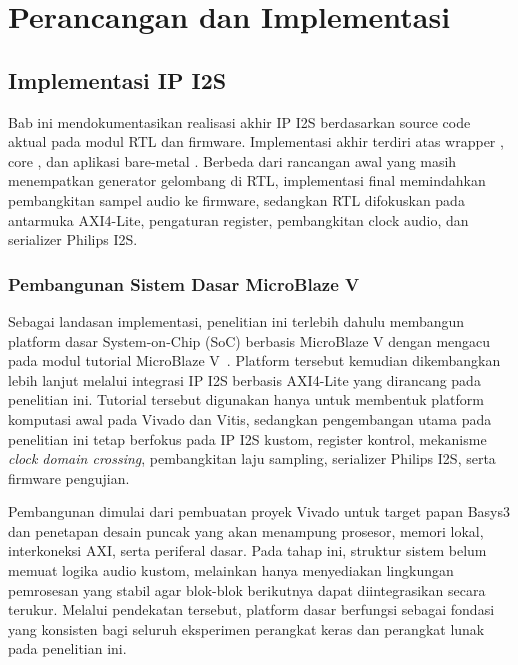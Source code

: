 \chapter{Perancangan dan Implementasi}

\section{Implementasi IP I2S}

Bab ini mendokumentasikan realisasi akhir IP I2S berdasarkan source code aktual pada modul RTL dan firmware. Implementasi akhir terdiri atas wrapper , core , dan aplikasi bare-metal . Berbeda dari rancangan awal yang masih menempatkan generator gelombang di RTL, implementasi final memindahkan pembangkitan sampel audio ke firmware, sedangkan RTL difokuskan pada antarmuka AXI4-Lite, pengaturan register, pembangkitan clock audio, dan serializer Philips I2S.

\subsection{Pembangunan Sistem Dasar MicroBlaze V}

Sebagai landasan implementasi, penelitian ini terlebih dahulu membangun platform dasar System-on-Chip (SoC) berbasis MicroBlaze V dengan mengacu pada modul tutorial MicroBlaze V~\cite{bejo2025microblazev}. Platform tersebut kemudian dikembangkan lebih lanjut melalui integrasi IP I2S berbasis AXI4-Lite yang dirancang pada penelitian ini. Tutorial tersebut digunakan hanya untuk membentuk platform komputasi awal pada Vivado dan Vitis, sedangkan pengembangan utama pada penelitian ini tetap berfokus pada IP I2S kustom, register kontrol, mekanisme \textit{clock domain crossing}, pembangkitan laju sampling, serializer Philips I2S, serta firmware pengujian.

Pembangunan dimulai dari pembuatan proyek Vivado untuk target papan Basys3 dan penetapan desain puncak yang akan menampung prosesor, memori lokal, interkoneksi AXI, serta periferal dasar. Pada tahap ini, struktur sistem belum memuat logika audio kustom, melainkan hanya menyediakan lingkungan pemrosesan yang stabil agar blok-blok berikutnya dapat diintegrasikan secara terukur. Melalui pendekatan tersebut, platform dasar berfungsi sebagai fondasi yang konsisten bagi seluruh eksperimen perangkat keras dan perangkat lunak pada penelitian ini.

